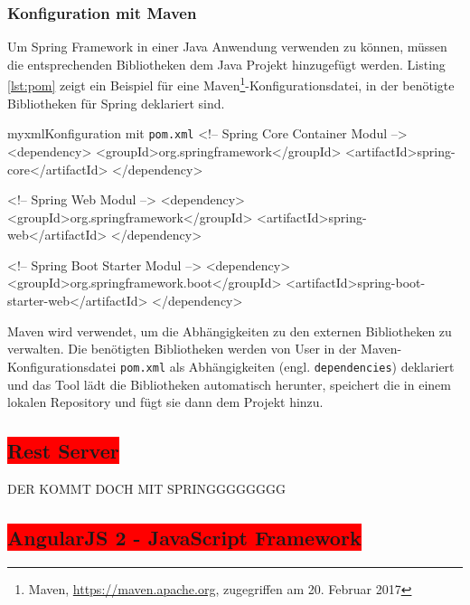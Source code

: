 \subsubsection{Konfiguration mit Maven}

Um Spring Framework in einer Java Anwendung verwenden zu können, müssen die entsprechenden Bibliotheken dem Java Projekt hinzugefügt werden. Listing \ref{lst:pom} zeigt ein Beispiel für eine Maven\footnote{Maven, \url{https://maven.apache.org}, zugegriffen am 20. Februar 2017}-Konfigurationsdatei, in der benötigte Bibliotheken für Spring deklariert sind.

\begin{listingsboxJava}[label={lst:pom}]{myxml}{Konfiguration mit \texttt{pom.xml}}
	<!-- Spring Core Container Modul -->
	<dependency>
		<groupId>org.springframework</groupId>
		<artifactId>spring-core</artifactId>
	</dependency>

	<!-- Spring Web Modul -->
	<dependency>
		<groupId>org.springframework</groupId>
		<artifactId>spring-web</artifactId>
	</dependency>
	
	<!-- Spring Boot Starter Modul -->
	<dependency>
		<groupId>org.springframework.boot</groupId>
		<artifactId>spring-boot-starter-web</artifactId>
	</dependency>
\end{listingsboxJava}
Maven wird verwendet, um die Abhängigkeiten zu den externen Bibliotheken zu verwalten. Die benötigten Bibliotheken werden von User in der Maven- Konfigurationsdatei \texttt{pom.xml} als Abhängigkeiten (engl. \texttt{dependencies}) deklariert und das Tool lädt die Bibliotheken automatisch herunter, speichert die in einem lokalen Repository und fügt sie dann dem Projekt hinzu.

\subsection{\colorbox{red}{Rest Server}}
DER KOMMT DOCH MIT SPRINGGGGGGGG

\subsection{\colorbox{red}{AngularJS 2 - JavaScript Framework}}

